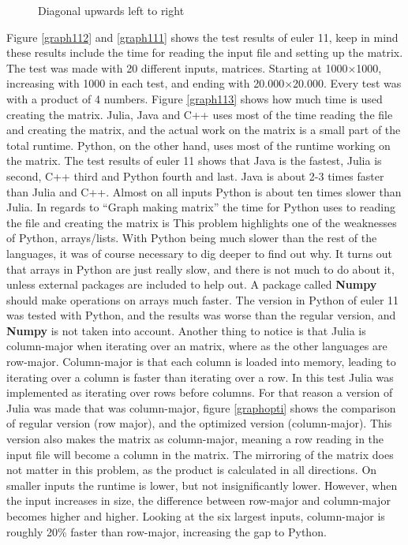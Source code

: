 \documentclass[a4paper, 11pt, titlepage]{article}
\begin{document}
\begin{figure}[H]
	\begin{center}
		
		\caption{Diagonal upwards left to right}
		\label{113}
	\end{center}
\end{figure}
Figure \ref{graph112} and \ref{graph111} shows the test results of euler 11, keep in mind these results include the time for reading the input file and setting up the matrix. The test was made with 20 different inputs, matrices. Starting at 1000$\times$1000, increasing with 1000 in each test, and ending with 20.000$\times$20.000. Every test was with a product of 4 numbers. Figure \ref{graph113} shows how much time is used creating the matrix. Julia, Java and C++ uses most of the time reading the file and creating the matrix, and the actual work on the matrix is a small part of the total runtime. Python, on the other hand, uses most of the runtime working on the matrix. The test results of euler 11 shows that Java is the fastest, Julia is second, C++ third and Python fourth and last. Java is about 2-3 times faster than Julia and C++. Almost on all inputs Python is about ten times slower than Julia. In regards to “Graph making matrix” the time for Python uses to reading the file and creating the matrix is  This problem highlights one of the weaknesses of Python, arrays/lists. With Python being much slower than the rest of the languages, it was of course necessary to dig deeper to find out why. It turns out that arrays in Python are just really slow, and there is not much to do about it, unless external packages are included to help out. A package called \textbf{Numpy} should make operations on arrays much faster. The version in Python of euler 11 was tested with Python, and the results was worse than the regular version, and \textbf{Numpy} is not taken into account. Another thing to notice is that Julia is column-major when iterating over an matrix, where as the other languages are row-major. Column-major is that each column is loaded into memory, leading to iterating over a column is faster than iterating over a row. In this test Julia was implemented as iterating over rows before columns. For that reason a version of Julia was made that was column-major, figure \ref{graphopti} shows the comparison of regular version (row major), and the optimized version (column-major). This version also makes the matrix as column-major, meaning a row reading in the input file will become a column in the matrix. The mirroring of the matrix does not matter in this problem, as the product is calculated in all directions. On smaller inputs the runtime is lower, but not insignificantly lower. However, when the input increases in size, the difference between row-major and column-major becomes higher and higher. Looking at the six largest inputs, column-major is roughly 20\% faster than row-major, increasing the gap to Python.
\end{document}
